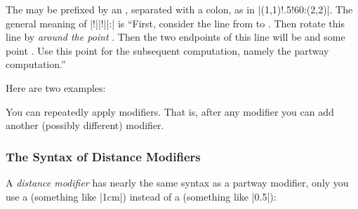 The  may be prefixed by an ,
separated with a colon, as in |(1,1)!.5!60:(2,2)|. The general meaning
of |!||!||:| is ``First,
consider the line from  to . Then rotate this line by
 \emph{around the point }. Then the two endpoints
of this line will be  and some point . Use this point
 for the subsequent computation, namely the partway
computation.''

Here are two examples:
\begin{codeexample}[]
\end{codeexample}


\begin{codeexample}[]
\end{codeexample}


You can repeatedly apply modifiers. That is, after any modifier
you can add another (possibly different) modifier.

\begin{codeexample}[]
\end{codeexample}


\subsubsection{The Syntax of Distance Modifiers}

A \emph{distance modifier} has nearly the same syntax as a partway
modifier, only you use a  (something like |1cm|)
instead of a  (something like |0.5|):
\begin{quote}
\end{quote}

